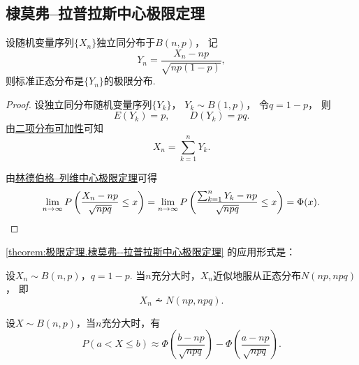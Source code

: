 \subsection{棣莫弗--拉普拉斯中心极限定理}
\begin{theorem}\label{theorem:极限定理.棣莫弗--拉普拉斯中心极限定理}
设随机变量序列\(\{X_n\}\)独立同分布于\(B(n,p)\)，
记\begin{equation*}
	Y_n = \frac{X_n - np}{\sqrt{np(1-p)}},
\end{equation*}
则标准正态分布是\(\{Y_n\}\)的极限分布.
\begin{proof}
设独立同分布随机变量序列\(\{Y_k\}\)，
\(Y_k \sim B(1,p)\)，
令\(q=1-p\)，
则\begin{equation*}
	E(Y_k)=p,
	\qquad
	D(Y_k)=pq.
\end{equation*}
由\hyperref[theorem:多维随机变量及其分布.二项分布的可加性3]{二项分布可加性}可知\begin{equation*}
	X_n = \sum_{k=1}^n Y_k.
\end{equation*}

由\hyperref[theorem:极限定理.林德伯格--列维中心极限定理]{林德伯格--列维中心极限定理}可得\begin{equation*}
	\lim_{n\to\infty} P\left(\frac{X_n-np}{\sqrt{npq}} \leq x\right)
	= \lim_{n\to\infty} P\left(\frac{\sum_{k=1}^n{Y_k}-np}{\sqrt{npq}} \leq x\right)
	= \Phi(x).
	\qedhere
\end{equation*}
\end{proof}
\end{theorem}

\cref{theorem:极限定理.棣莫弗--拉普拉斯中心极限定理} 的应用形式是：
\begin{corollary}
设\(X_n \sim B(n,p)\)，\(q = 1-p\).
当\(n\)充分大时，\(X_n\)近似地服从正态分布\(N(np,npq)\)，
即\begin{equation*}
	X_n \dotsim N(np,npq).
\end{equation*}
\end{corollary}

\begin{corollary}
设\(X \sim B(n,p)\)，当\(n\)充分大时，有\begin{equation*}
	P(a < X \leq b)
	\approx
	\Phi\left(\frac{b-np}{\sqrt{npq}}\right)
	- \Phi\left(\frac{a-np}{\sqrt{npq}}\right).
\end{equation*}
\end{corollary}

